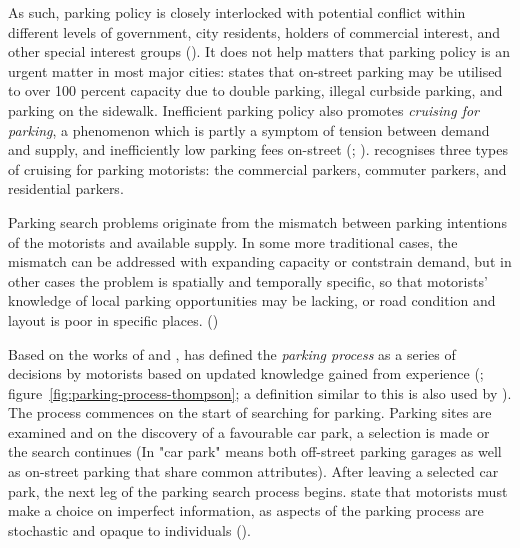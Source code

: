 As such, parking policy is closely interlocked with potential conflict within different levels of government, city residents, holders of commercial interest, and other special interest groups (\cite{Ker1988}). It does not help matters that parking policy is an urgent matter in most major cities: \cite{Arnott2006} states that on-street parking may be utilised to over 100 percent capacity due to double parking, illegal curbside parking, and parking on the sidewalk. Inefficient parking policy also promotes \textit{cruising for parking}, a phenomenon which is partly a symptom of tension between demand and supply, and inefficiently low parking fees on-street (\cite{Shoup2004}; \citeyear{Shoup2006}).  recognises three types of cruising for parking motorists: the commercial parkers, commuter parkers, and residential parkers.

Parking search problems originate from the mismatch between parking intentions of the motorists and available supply. In some more traditional cases, the mismatch can be addressed with expanding capacity or contstrain demand, but in other cases the problem is spatially and temporally specific, so that motorists' knowledge of local parking opportunities may be lacking, or road condition and layout is poor in specific places. (\cite{Axhausen1993})

Based on the works of  and , \citeauthor{Thompson1998} has defined the \textit{parking process} as a series of decisions by motorists based on updated knowledge gained from experience (\citeyear{Thompson1998}; figure~\ref{fig:parking-process-thompson}; a definition similar to this is also used by \cite{Guo2013}). The process commences on the start of searching for parking. Parking sites are examined and on the discovery of a favourable car park, a selection is made or the search continues (In \cite{Thompson1998} "car park" means both off-street parking garages as well as on-street parking that share common attributes). After leaving a selected car park, the next leg of the parking search process begins. \citeauthor{Thompson1998} state that motorists must make a choice on imperfect information, as aspects of the parking process are stochastic and opaque to individuals (\citeyear{Thompson1998}).


